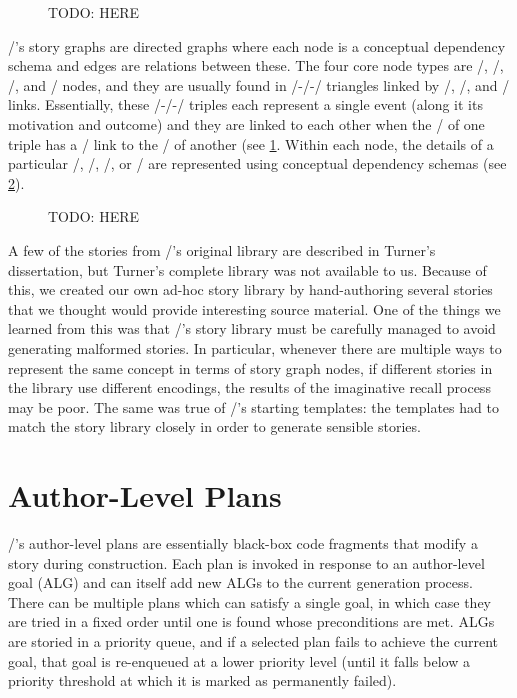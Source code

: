 \begin{figure}
\caption{TODO: HERE}
\label{fig:story-graph}
\end{figure}


\minstrel/'s story graphs are directed graphs where each node is a conceptual dependency schema and edges are relations between these.
%
The four core node types are \gng/, \gna/, \gns/, and \gnb/ nodes, and they are usually found in \gng/-\gna/-\gns/ triangles linked by \gep/, \gei/, and \gea/ links.
%
Essentially, these \gng/-\gna/-\gns/ triples each represent a single event (along it its motivation and outcome) and they are linked to each other when the \gns/ of one triple has a \gem/ link to the \gng/ of another (see \cref{fig:story-graph}.
%
Within each node, the details of a particular \gng/, \gna/, \gns/, or \gnb/ are represented using conceptual dependency schemas (see \cref{fig:cd-nodes}).


\begin{figure}
\caption{TODO: HERE}
\label{fig:cd-nodes}
\end{figure}


A few of the stories from \minstrel/'s original library are described in Turner's dissertation, but Turner's complete library was not available to us.
%
Because of this, we created our own ad-hoc story library by hand-authoring several stories that we thought would provide interesting source material.
%
One of the things we learned from this was that \minstrel/'s story library must be carefully managed to avoid generating malformed stories.
%
In particular, whenever there are multiple ways to represent the same concept in terms of story graph nodes, if different stories in the library use different encodings, the results of the imaginative recall process may be poor.
%
The same was true of \minstrel/'s starting templates: the templates had to match the story library closely in order to generate sensible stories.


\section{Author-Level Plans}

\minstrel/'s author-level plans are essentially black-box code fragments that modify a story during construction.
%
Each plan is invoked in response to an author-level goal (ALG) and can itself add new ALGs to the current generation process.
%
There can be multiple plans which can satisfy a single goal, in which case they are tried in a fixed order until one is found whose preconditions are met.
%
ALGs are storied in a priority queue, and if a selected plan fails to achieve the current goal, that goal is re-enqueued at a lower priority level (until it falls below a priority threshold at which it is marked as permanently failed).


